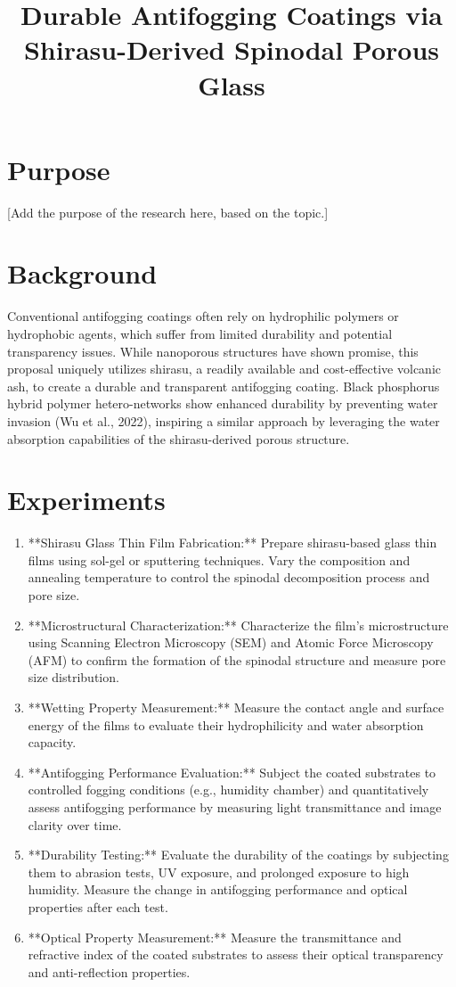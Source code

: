 \documentclass{article}
\title{Durable Antifogging Coatings via Shirasu-Derived Spinodal Porous Glass}
\author{}
\date{}
\begin{document}
\maketitle
\section{Purpose}
[Add the purpose of the research here, based on the topic.]

\section{Background}
Conventional antifogging coatings often rely on hydrophilic polymers or hydrophobic agents, which suffer from limited durability and potential transparency issues. While nanoporous structures have shown promise, this proposal uniquely utilizes shirasu, a readily available and cost-effective volcanic ash, to create a durable and transparent antifogging coating. Black phosphorus hybrid polymer hetero-networks show enhanced durability by preventing water invasion (Wu et al., 2022), inspiring a similar approach by leveraging the water absorption capabilities of the shirasu-derived porous structure.

\section{Experiments}
\begin{enumerate}
\item **Shirasu Glass Thin Film Fabrication:** Prepare shirasu-based glass thin films using sol-gel or sputtering techniques. Vary the composition and annealing temperature to control the spinodal decomposition process and pore size.
\item **Microstructural Characterization:** Characterize the film's microstructure using Scanning Electron Microscopy (SEM) and Atomic Force Microscopy (AFM) to confirm the formation of the spinodal structure and measure pore size distribution.
\item **Wetting Property Measurement:** Measure the contact angle and surface energy of the films to evaluate their hydrophilicity and water absorption capacity.
\item **Antifogging Performance Evaluation:** Subject the coated substrates to controlled fogging conditions (e.g., humidity chamber) and quantitatively assess antifogging performance by measuring light transmittance and image clarity over time.
\item **Durability Testing:** Evaluate the durability of the coatings by subjecting them to abrasion tests, UV exposure, and prolonged exposure to high humidity. Measure the change in antifogging performance and optical properties after each test.
\item **Optical Property Measurement:** Measure the transmittance and refractive index of the coated substrates to assess their optical transparency and anti-reflection properties.
\end{enumerate}
\end{document}

